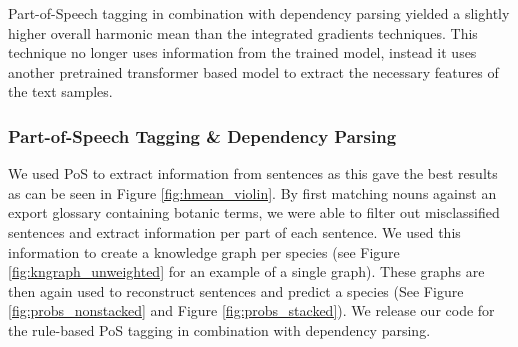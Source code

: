 \documentclass[a4paper, 12pt, oneside]{book} %
\begin{document}
Part-of-Speech tagging in combination with dependency parsing yielded a slightly higher overall harmonic mean than the integrated gradients techniques.
This technique no longer uses information from the trained model, instead it uses another pretrained transformer based model to extract the necessary features of the text samples.

\subsubsection{Part-of-Speech Tagging \& Dependency Parsing}
We used PoS to extract information from sentences as this gave the best results as can be seen in Figure \ref{fig:hmean_violin}.
By first matching nouns against an export glossary containing botanic terms, we were able to filter out misclassified sentences and extract information per part of each sentence.
We used this information to create a knowledge graph per species (see Figure \ref{fig:kngraph_unweighted} for an example of a single graph). 
These graphs are then again used to reconstruct sentences and predict a species (See Figure \ref{fig:probs_nonstacked} and Figure \ref{fig:probs_stacked}).
We release our code for the rule-based PoS tagging in combination with dependency parsing.
\end{document}
